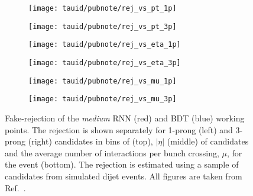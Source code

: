 \begin{figure}[htbp]

  \begin{subfigure}{0.498\textwidth}
    \texttt{[image: tauid/pubnote/rej\_vs\_pt\_1p]}
    \subcaption{}%
    \label{fig:tauid_faketau_rej_a}
  \end{subfigure}\hfill%
  \begin{subfigure}{0.498\textwidth}
    \texttt{[image: tauid/pubnote/rej\_vs\_pt\_3p]}
    \subcaption{}%
    \label{fig:tauid_faketau_rej_b}
  \end{subfigure}

  \begin{subfigure}{0.498\textwidth}
    \texttt{[image: tauid/pubnote/rej\_vs\_eta\_1p]}
    \subcaption{}
  \end{subfigure}\hfill%
  \begin{subfigure}{0.498\textwidth}
    \texttt{[image: tauid/pubnote/rej\_vs\_eta\_3p]}
    \subcaption{}
  \end{subfigure}

  \begin{subfigure}{0.498\textwidth}
    \texttt{[image: tauid/pubnote/rej\_vs\_mu\_1p]}
    \subcaption{}%
    \label{fig:tauid_faketau_rej_e}
  \end{subfigure}\hfill%
  \begin{subfigure}{0.498\textwidth}
    \texttt{[image: tauid/pubnote/rej\_vs\_mu\_3p]}
    \subcaption{}%
    \label{fig:tauid_faketau_rej_f}
  \end{subfigure}

  \caption[Fake-\tauhadvis rejection of the \emph{medium} RNN and BDT \tauid
  working points.]{Fake-\tauhadvis rejection of the \emph{medium} RNN (red) and
    BDT (blue) \tauid working points. The rejection is shown separately for
    1-prong (left) and 3-prong (right) \tauhadvis candidates in bins of \pT
    (top), $|\eta|$ (middle) of \tauhadvis candidates and the average number of
    interactions per bunch crossing, $\mu$, for the event (bottom). The
    rejection is estimated using a sample of \tauhadvis candidates from
    simulated dijet events. All figures are taken from
    Ref.~\cite{ATL-PHYS-PUB-2019-033}.}%
  \label{fig:tauid_faketau_rej}
\end{figure}

